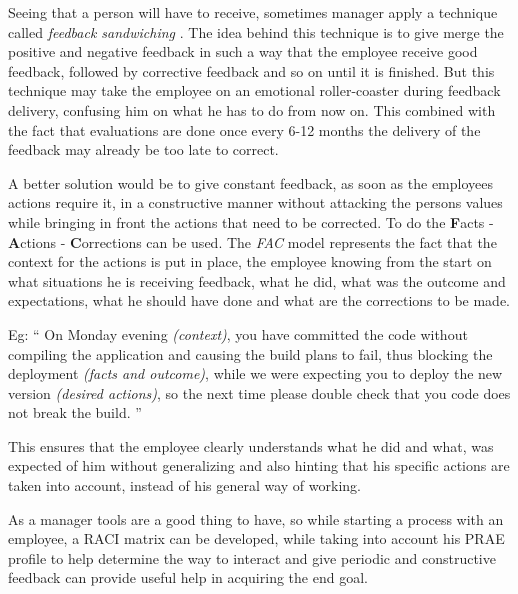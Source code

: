 Seeing that a person will have to receive, sometimes manager apply a technique called \textit{feedback sandwiching} \cite{fbs}. The idea behind this technique is to give merge the positive and negative feedback in such a way that the employee receive good feedback, followed by corrective feedback and so on until it is finished. But this technique may take the employee on an emotional roller-coaster during feedback delivery, confusing him on what he has to do from now on. This combined with the fact that evaluations are done once every 6-12 months the delivery of the feedback may already be too late to correct.

A better solution would be to give constant feedback, as soon as the employees actions require it, in a constructive manner without attacking the persons values while bringing in front the actions that need to be corrected. To do the \textbf{F}acts - \textbf{A}ctions - \textbf{C}orrections can be used. The \textit{FAC} model represents the fact that the context for the actions is put in place, the employee knowing from the start on what situations he is receiving feedback, what he did, what was the outcome and expectations, what he should have done and what are the corrections to be made.

Eg:
`` On Monday evening \textit{(context)}, you have committed the code without compiling the application and causing the build plans to fail, thus blocking the deployment \textit{(facts and outcome)}, while we were expecting you to deploy the new version \textit{(desired actions)}, so the next time please double check that you code does not break the build. ''

This ensures that the employee clearly understands what he did and what, was expected of him without generalizing and also hinting that his specific actions are taken into account, instead of his general way of working.


As a manager tools are a good thing to have, so while starting a process with an employee, a RACI matrix can be developed, while taking into account his PRAE profile to help determine the way to interact and give periodic and constructive feedback can provide useful help in acquiring the end goal.